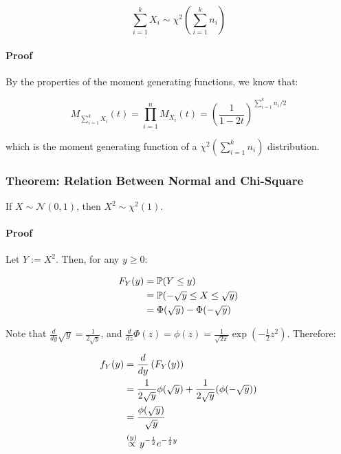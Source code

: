 \documentclass[a4paper]{article}
\begin{document}
                \[
                    \sum_{i=1}^k X_i \sim \chi^2\left(\sum_{i=1}^k n_i\right)
                \]

                \paragraph{Proof}
                    By the properties of the moment generating functions, we
                    know that:

                    \[
                        M_{\sum_{i=1}^k X_i} (t) = \prod_{i=1}^n M_{X_i}(t) =
                        \left(\frac{1}{1 - 2t}\right)^{\sum_{i=1}^k n_i/2}
                    \]

                    which is the moment generating function of a $\chi^2
                    \left(\sum\limits_{i=1}^k n_i\right)$ distribution.

            \subsubsection{Theorem: Relation Between Normal and Chi-Square}
                If $X \sim \mathcal{N}(0, 1)$, then $X^2 \sim \chi^2(1)$.

                \paragraph{Proof}
                    Let $Y := X^2$. Then, for any $y \geq 0$:

                    \begin{align*}
                        F_Y(y) & = \mathbb{P}(Y \leq y) \\
                        & = \mathbb{P}(-\sqrt{y} \leq X \leq \sqrt{y}) \\
                        & = \Phi(\sqrt{y}) - \Phi(-\sqrt{y})
                    \end{align*}

                    Note that $\frac{d}{dy}\sqrt{y} = \frac{1}{2\sqrt{y}}$, and
                    $\frac{d}{dz}\Phi(z) = \phi(z) = \frac{1}{\sqrt{2\pi}} \exp
                    \left(-\frac{1}{2}z^2\right)$. Therefore:

                    \begin{align*}
                        f_Y(y) & = \frac{d}{dy}\left(F_Y(y)\right) \\
                        & = \frac{1}{2\sqrt{y}} \phi(\sqrt{y}) +
                            \frac{1}{2\sqrt{y}} (\phi(-\sqrt{y})) \\
                        & = \frac{\phi(\sqrt{y})}{\sqrt{y}} \\
                        & \stackrel{({y})}{\propto} y^{-\frac{1}{2}}e^{-\frac{1}{2}y}
                    \end{align*}
\end{document}
